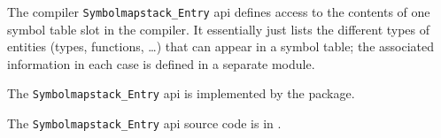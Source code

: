 
The compiler {\tt Symbolmapstack\_Entry} api defines access to the contents of one symbol 
table slot in the compiler.  It essentially just lists the different types of entities 
(types, functions, \ldots) that can appear in a symbol table;  the associated information 
in each case is defined in a separate module.

The {\tt Symbolmapstack\_Entry} api is implemented by the  package.

The {\tt Symbolmapstack\_Entry} api source code is in .

